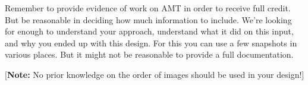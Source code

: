 \documentclass[11pt]{article}
\begin{document}
\begin{enumerate}
Remember to provide evidence of work on AMT in order to receive full
credit.
But be reasonable in deciding how much information to include. We're looking
for enough to understand your approach, understand what it did on
this input, and why you ended up with this design. For this you can
use a few snapshots in various places. But it might not be reasonable
to provide a full documentation. 

[\textbf{Note:} No prior knowledge on the order of images should
be used in your design!]

\end{enumerate}
\end{document}
